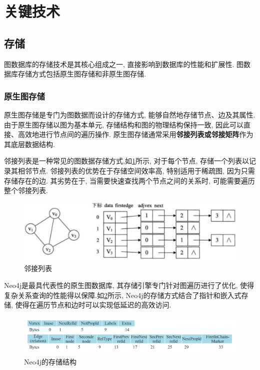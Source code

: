 \section{关键技术}

\subsection{存储}

图数据库的存储技术是其核心组成之一, 直接影响到数据库的性能和扩展性. 图数据库存储方式包括原生图存储和非原生图存储.

\vspace{1cm}
\subsubsection*{原生图存储}

原生图存储是专门为图数据而设计的存储方式, 能够自然地存储节点、边及其属性. 由于原生图存储以图为基本单元, 存储结构和图的物理结构保持一致, 因此可以直接、高效地进行节点间的遍历操作. 原生图存储通常采用\textbf{邻接列表或邻接矩阵}作为其底层数据结构.

邻接列表是一种常见的图数据存储方式,如\cref{fig:adjacency-list}所示, 对于每个节点, 存储一个列表以记录其相邻节点. 邻接列表的优势在于存储空间效率高, 特别适用于稀疏图, 因为只需存储存在的边. 其劣势在于, 当需要快速查找两个节点之间的关系时, 可能需要遍历整个邻接列表.
\begin{figure}[H]
	\centering
	\includegraphics[width=1\textwidth]{images/11.png}
	\caption{邻接列表}
	\label{fig:adjacency-list}
\end{figure}

Neo4j是最具代表性的原生图数据库, 其存储引擎专门针对图遍历进行了优化, 使得复杂关系查询的性能得以保障.如\cref{fig:neo4j}所示, Neo4j的存储方式结合了指针和嵌入式存储, 使得在遍历节点和边时可以实现低延迟的高效访问.
\begin{figure}[H]
	\centering
	\includegraphics[width=1\textwidth]{images/4.png}
	\caption{Neo4j的存储结构}
	\label{fig:neo4j}
\end{figure}

